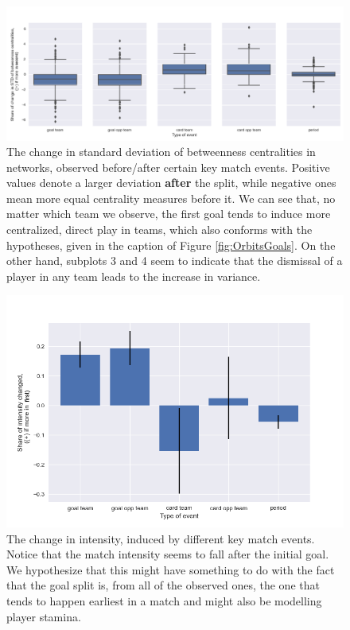 \documentclass[9pt,twocolumn,twoside]{pnas-report}
\begin{document}
\begin{figure}[t]\centering
	\includegraphics[width=\linewidth]{betweenness.png}
	\caption{The change in standard deviation of betweenness centralities in networks, observed before/after certain key match events. Positive values denote a larger deviation \textbf{after} the split, while negative ones mean more equal centrality measures before it. We can see that, no matter which team we observe, the first goal tends to induce more centralized, direct play in teams, which also conforms with the hypotheses, given in the caption of Figure \ref{fig:OrbitsGoals}. On the other hand, subplots 3 and 4 seem to indicate that the dismissal of a player in any team leads to the increase in variance.}
	\label{fig:centralities}
\end{figure}

\begin{figure}[t]\centering
	\includegraphics[width=\linewidth]{intensity.png}
	\caption{The change in intensity, induced by different key match events. Notice that the match intensity seems to fall after the initial goal. We hypothesize that this might have something to do with the fact that the goal split is, from all of the observed ones, the one that tends to happen earliest in a match and might also be modelling player stamina.}
	\label{fig:intensity}
\end{figure}
\end{document}
